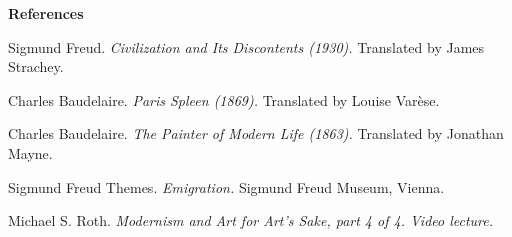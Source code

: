 \begin{multicols}{2}
\bigskip

\noindent\textbf{\large References}

\begin{enumerate}[{[1]}]
\item Sigmund Freud. \emph{Civilization and Its Discontents (1930).} Translated by James Strachey.
\item Charles Baudelaire. \emph{Paris Spleen (1869).} Translated by Louise Varèse.
\item Charles Baudelaire. \emph{The Painter of Modern Life (1863).} Translated by Jonathan Mayne.
\item Sigmund Freud Themes. \emph{Emigration.} Sigmund Freud Museum, Vienna.
\item Michael S. Roth. \emph{Modernism and Art for Art's Sake, part 4 of 4. Video lecture.}
\end{enumerate}
\end{multicols}

\newpage
